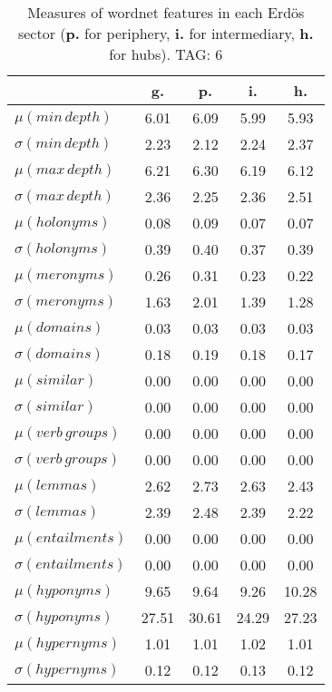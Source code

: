 \begin{table}[h!]
\begin{center}
\begin{tabular}{| l || c | c | c | c |}\hline
 & {\bf g.} & {\bf p.} & {\bf i.} & {\bf h.} \\\hline\hline
$\mu(min\,depth)$ & 6.01  & 6.09  & 5.99  & 5.93 \\
$\sigma(min\,depth)$ & 2.23  & 2.12  & 2.24  & 2.37 \\\hline
$\mu(max\,depth)$ & 6.21  & 6.30  & 6.19  & 6.12 \\
$\sigma(max\,depth)$ & 2.36  & 2.25  & 2.36  & 2.51 \\\hline
$\mu(holonyms)$ & 0.08  & 0.09  & 0.07  & 0.07 \\
$\sigma(holonyms)$ & 0.39  & 0.40  & 0.37  & 0.39 \\\hline
$\mu(meronyms)$ & 0.26  & 0.31  & 0.23  & 0.22 \\
$\sigma(meronyms)$ & 1.63  & 2.01  & 1.39  & 1.28 \\\hline
$\mu(domains)$ & 0.03  & 0.03  & 0.03  & 0.03 \\
$\sigma(domains)$ & 0.18  & 0.19  & 0.18  & 0.17 \\\hline
$\mu(similar)$ & 0.00  & 0.00  & 0.00  & 0.00 \\
$\sigma(similar)$ & 0.00  & 0.00  & 0.00  & 0.00 \\\hline
$\mu(verb\,groups)$ & 0.00  & 0.00  & 0.00  & 0.00 \\
$\sigma(verb\,groups)$ & 0.00  & 0.00  & 0.00  & 0.00 \\\hline
$\mu(lemmas)$ & 2.62  & 2.73  & 2.63  & 2.43 \\
$\sigma(lemmas)$ & 2.39  & 2.48  & 2.39  & 2.22 \\\hline
$\mu(entailments)$ & 0.00  & 0.00  & 0.00  & 0.00 \\
$\sigma(entailments)$ & 0.00  & 0.00  & 0.00  & 0.00 \\\hline
$\mu(hyponyms)$ & 9.65  & 9.64  & 9.26  & 10.28 \\
$\sigma(hyponyms)$ & 27.51  & 30.61  & 24.29  & 27.23 \\\hline
$\mu(hypernyms)$ & 1.01  & 1.01  & 1.02  & 1.01 \\
$\sigma(hypernyms)$ & 0.12  & 0.12  & 0.13  & 0.12 \\\hline
\end{tabular}
\caption{Measures of wordnet features in each Erd\"os sector ({{\bf p.}} for periphery, {{\bf i.}} for intermediary, {{\bf h.}} for hubs). TAG: 6}
\end{center}
\end{table}